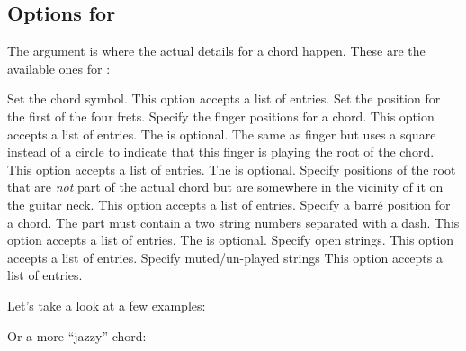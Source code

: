 \documentclass[toc=index,toc=bib]{cnpkgdoc}
\begin{document}
\subsection{Options for }
The  argument is where the actual details for a chord happen. These
are the available ones for :
\begin{beschreibung}
 \newline
   Set the chord symbol. This option accepts a list of entries.
 \newline
   Set the position for the first of the four frets.
 \newline
   Specify the finger positions for a chord. This option accepts a list of entries.
   The  is optional.
 \newline
   The same as finger but uses a square instead of a circle to indicate that
   this finger is playing the root of the chord. This option accepts a list of
   entries. The  is optional.
 \newline
   Specify positions of the root that are \emph{not} part of the actual chord
   but are somewhere in the vicinity of it on the guitar neck. This option
   accepts a list of entries.
 \newline
   Specify a barr\'e position for a chord. The  part must
   contain a two string numbers separated with a dash. This option accepts a list
   of entries. The  is optional.
 \newline
   Specify open strings. This option accepts a list of entries.
 \newline
   Specify muted/un-played strings This option accepts a list of entries.
\end{beschreibung}

Let's take a look at a few examples:

\begin{beispiel}
 \chordscheme[
   name      = G ,
   position  = I ,
   finger    = {2/5:1} ,
   root      = {3/6:2, 3/1:4} ,
   ring      = {2,3,4}
 ]
\end{beispiel}

Or a more “jazzy” chord:
\begin{beispiel}
 \chordscheme[
   name      = G\textsuperscript{6} ,
   position  = II ,
   finger    = {1/4:1, 3/3:4, 2/2:3} ,
   root      = 2/6:2 ,
   show-root = 4/4 ,
   mute      = {1,5}
 ]
\end{beispiel}
\end{document}
